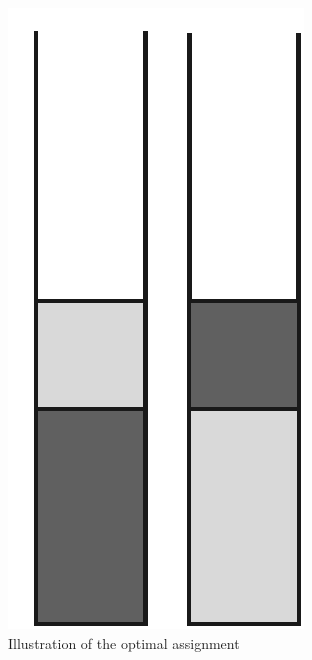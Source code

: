 \documentclass[a4paper,11pt]{article}
\begin{document}
\begin{figure}
        \centering
        \begin{subfigure}{0.3\textwidth}
                \centering
                \includegraphics[scale=0.4]{figuura.pdf}
              \caption{Illustration of the optimal assignment}
                \label{fig:a}
        \end{subfigure}%
        ~ %
        \begin{subfigure}{0.3\textwidth}
                \centering

\end{subfigure}
\end{figure}
\end{document}
